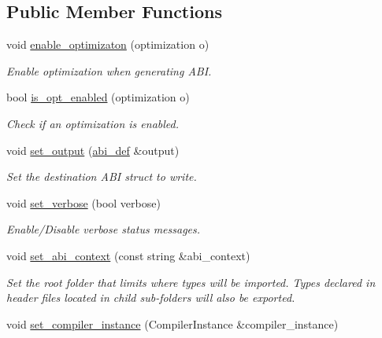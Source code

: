 \subsection*{Public Member Functions}
\begin{DoxyCompactItemize}
\item 
void \mbox{\hyperlink{classaacio_1_1abi__generator_a97a49b2ddf02669e5dbb6554ac352ac5}{enable\+\_\+optimizaton}} (optimization o)
\begin{DoxyCompactList}\small\item\em Enable optimization when generating A\+BI. \end{DoxyCompactList}\item 
bool \mbox{\hyperlink{classaacio_1_1abi__generator_a4ce111fa604e4dd79587c3736cc93c1f}{is\+\_\+opt\+\_\+enabled}} (optimization o)
\begin{DoxyCompactList}\small\item\em Check if an optimization is enabled. \end{DoxyCompactList}\item 
void \mbox{\hyperlink{classaacio_1_1abi__generator_a09053d5b188493c36b9b39ae0a30f737}{set\+\_\+output}} (\mbox{\hyperlink{structaacio_1_1chain_1_1contracts_1_1abi__def}{abi\+\_\+def}} \&output)
\begin{DoxyCompactList}\small\item\em Set the destination A\+BI struct to write. \end{DoxyCompactList}\item 
void \mbox{\hyperlink{classaacio_1_1abi__generator_a8e0112db8062948a939b3db83d0e0884}{set\+\_\+verbose}} (bool verbose)
\begin{DoxyCompactList}\small\item\em Enable/\+Disable verbose status messages. \end{DoxyCompactList}\item 
void \mbox{\hyperlink{classaacio_1_1abi__generator_a9a1345c18ec1a52dc188383e929e3a80}{set\+\_\+abi\+\_\+context}} (const string \&abi\+\_\+context)
\begin{DoxyCompactList}\small\item\em Set the root folder that limits where types will be imported. Types declared in header files located in child sub-\/folders will also be exported. \end{DoxyCompactList}\item 
void \mbox{\hyperlink{classaacio_1_1abi__generator_a0c33878a4bc413470c67aaa68a970bee}{set\+\_\+compiler\+\_\+instance}} (Compiler\+Instance \&compiler\+\_\+instance)

\end{DoxyCompactItemize}
